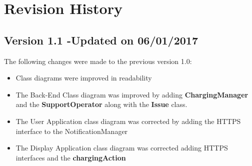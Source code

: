 \section{Revision History}
\subsection{Version 1.1 -Updated on 06/01/2017}
The following changes were made to the previous version 1.0:
\begin{itemize}
\item Class diagrams were improved in readability
\item The Back-End Class diagram was improved by adding \textbf{ChargingManager} and the \textbf{SupportOperator} along with the \textbf{Issue} class.
\item The User Application class diagram was corrected by adding the HTTPS interface to the NotificationManager
\item The Display Application class diagram was corrected adding HTTPS interfaces and the \textbf{chargingAction}
\end{itemize}